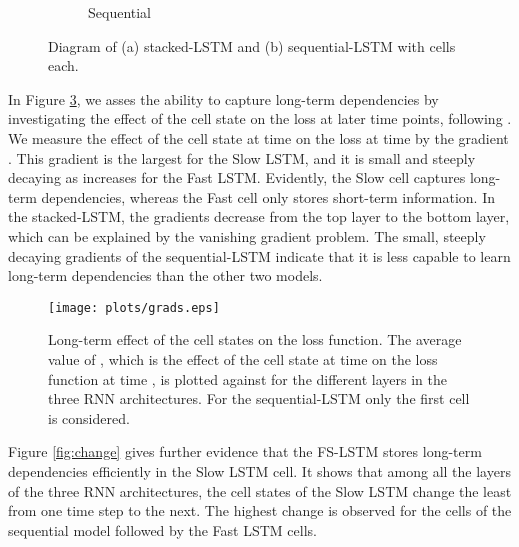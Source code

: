 \documentclass{article}
\begin{document}
\begin{figure}
\begin{subfigure}[b]{.55\textwidth}
   \caption{Sequential}
  \label{fig:seq}
\end{subfigure}\caption{Diagram of (a) stacked-LSTM and (b) sequential-LSTM  with  cells each.}
\label{fig:stack-seq}
\end{figure}








In Figure \ref{fig:grads}, we asses the ability to capture long-term dependencies by investigating the effect of the cell state on the loss  at later time points, following \cite{krueger16zoneout}.  We measure the effect of the cell state at time  on the loss  at time   by the gradient . This gradient is the largest for the Slow LSTM, and it is small and  steeply decaying as  increases for the Fast LSTM. Evidently, the Slow cell captures long-term dependencies, whereas the Fast cell only stores short-term information.  In the stacked-LSTM, the gradients decrease from the top layer to the bottom layer, which can be explained by the vanishing gradient problem. The small, steeply decaying gradients of the sequential-LSTM  indicate that it is less capable to learn long-term dependencies than the other two models.







\begin{figure}
    \centering
    \texttt{[image: plots/grads.eps]}
    \caption{Long-term effect of  the cell states on the loss function. The average value of , which is the effect of the cell state at time  on the loss function at time , is plotted against  for the different layers in the three RNN architectures.
For the sequential-LSTM only the first cell is considered.}
    \label{fig:grads}
\end{figure}



 Figure \ref{fig:change} gives further evidence that the FS-LSTM stores long-term dependencies efficiently in the Slow LSTM cell. It shows that among all the layers of the three RNN architectures, the cell states of the Slow LSTM change the least from one time step to the next. The highest change is observed for the cells of the sequential model followed by the Fast LSTM cells. 
\end{document}
